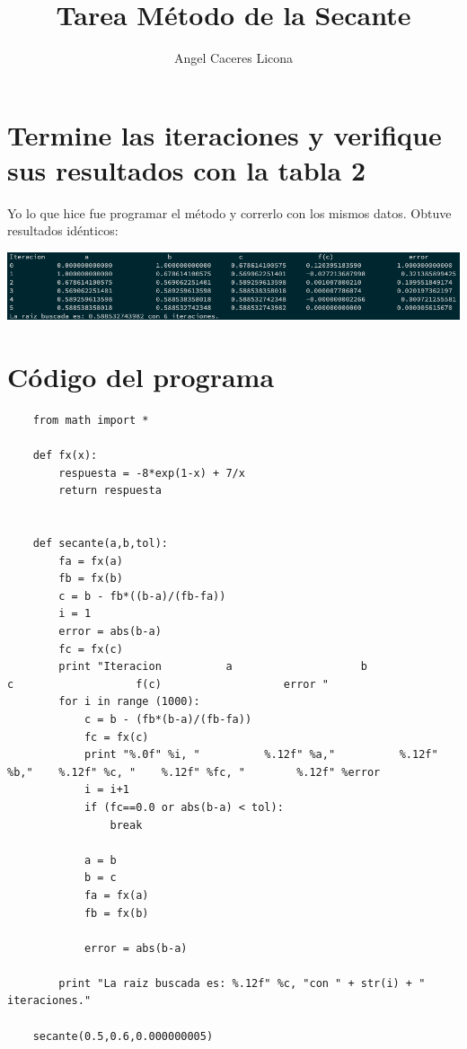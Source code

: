 \documentclass{article}
\begin{document}
\title{Tarea Método de la Secante}
\author{Angel Caceres Licona}

\maketitle


\section{Termine las iteraciones y verifique sus resultados con la tabla 2}
Yo lo que hice fue programar el método y correrlo con los mismos datos.
Obtuve resultados idénticos:

\includegraphics[scale=0.4]{resultadoSecante.png}

\section{Código del programa}

\begin{lstlisting}
    from math import *

    def fx(x):
        respuesta = -8*exp(1-x) + 7/x
        return respuesta
    
    
    def secante(a,b,tol):
        fa = fx(a)
        fb = fx(b)
        c = b - fb*((b-a)/(fb-fa))    
        i = 1
        error = abs(b-a)
        fc = fx(c)
        print "Iteracion          a                    b                 c                   f(c)                   error "
        for i in range (1000):
            c = b - (fb*(b-a)/(fb-fa))
            fc = fx(c)
            print "%.0f" %i, "          %.12f" %a,"          %.12f" %b,"    %.12f" %c, "    %.12f" %fc, "        %.12f" %error
            i = i+1
            if (fc==0.0 or abs(b-a) < tol):
                break
    
            a = b
            b = c
            fa = fx(a)
            fb = fx(b)
            
            error = abs(b-a)
    
        print "La raiz buscada es: %.12f" %c, "con " + str(i) + " iteraciones."
    
    secante(0.5,0.6,0.000000005)
\end{lstlisting}
\end{document}
